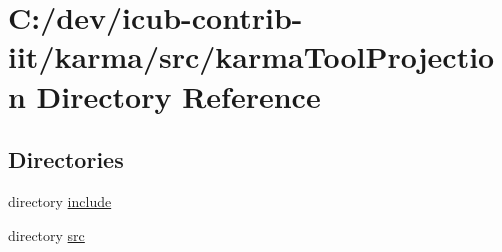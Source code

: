 \section{C\+:/dev/icub-\/contrib-\/iit/karma/src/karma\+Tool\+Projection Directory Reference}
\label{dir_41f00478989b00c299e09b5f630aa3f5}
\subsection*{Directories}
\begin{DoxyCompactItemize}
\item 
directory \hyperlink{dir_fe78f95ef73225985cbb37ca6fe2b4d3}{include}
\item 
directory \hyperlink{dir_fc03fb402f9f2a4202506acbbf0a4b9a}{src}
\end{DoxyCompactItemize}
